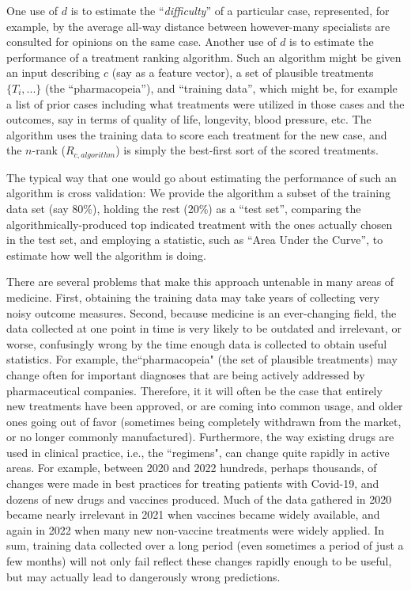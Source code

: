 \documentclass{article}
\begin{document}
One use of $d$ is to estimate the ``\emph{difficulty}'' of a particular case, represented, for example, by the average all-way distance between however-many specialists are consulted for opinions on the same case. Another use of $d$ is to estimate the performance of a treatment ranking algorithm. Such an algorithm might be given an input describing $c$ (say as a feature vector), a set of plausible treatments $\{T_i,...\}$ (the ``pharmacopeia''), and ``training data'', which might be, for example a list of prior cases including what treatments were utilized in those cases and the outcomes, say in terms of quality of life, longevity, blood pressure, etc. The algorithm uses the training data to score each treatment for the new case, and the $n$-rank ($R_{c,algorithm}$) is simply the best-first sort of the scored treatments. 

The typical way that one would go about estimating the performance of such an algorithm is cross validation: We provide the algorithm a subset of the training data set (say 80\%), holding the rest (20\%) as a ``test set'', comparing the algorithmically-produced top indicated treatment with the ones actually chosen in the test set, and employing a statistic, such as ``Area Under the Curve'', to estimate how well the algorithm is doing.   

There are several problems that make this approach untenable in many areas of medicine. First, obtaining the training data may take years of collecting very noisy outcome measures. Second, because medicine is an ever-changing field, the data collected at one point in time is very likely to be outdated and irrelevant, or worse, confusingly wrong by the time enough data is collected to obtain useful statistics. For example, the``pharmacopeia" (the set of plausible treatments) may change often for important diagnoses that are being actively addressed by pharmaceutical companies. Therefore, it it will often be the case that entirely new treatments have been approved, or are coming into common usage, and older ones going out of favor (sometimes being completely withdrawn from the market, or no longer commonly manufactured). Furthermore, the way existing drugs are used in clinical practice, i.e., the ``regimens", can change quite rapidly in active areas. For example, between 2020 and 2022 hundreds, perhaps thousands, of changes were made in best practices for treating patients with Covid-19, and dozens of new drugs and vaccines produced. Much of the data gathered in 2020 became nearly irrelevant in 2021 when vaccines became widely available, and again in 2022 when many new non-vaccine treatments were widely applied. In sum, training data collected over a long period (even sometimes a period of just a few months) will not only fail reflect these changes rapidly enough to be useful, but may actually lead to dangerously wrong predictions. 
\end{document}
